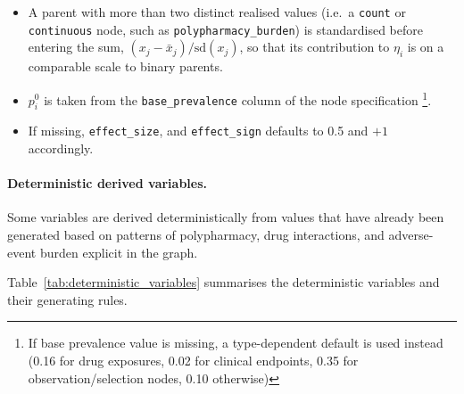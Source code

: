 \begin{itemize}
    \item A parent with more than two distinct realised values (i.e.\ a
    \texttt{count} or \texttt{continuous} node, such as
    \texttt{polypharmacy\_burden}) is standardised before entering
    the sum, $(x_j - \bar{x}_j) / \mathrm{sd}(x_j)$, so that its
    contribution to $\eta_i$ is on a comparable scale to binary parents.
    \item $p_i^{0}$ is taken from the \texttt{base\_prevalence} column of
    the node specification \footnote{If base prevalence value is missing, a type-dependent
    default is used instead (0.16 for drug exposures, 0.02 for clinical
    endpoints, 0.35 for observation/selection nodes, 0.10 otherwise)}.
    \item  If missing, \texttt{effect\_size}, and
    \texttt{effect\_sign} defaults to 0.5 and $+1$ accordingly.
\end{itemize}

\paragraph{Deterministic derived variables.}

Some variables are derived deterministically from values that have already been
generated based on  patterns of polypharmacy, drug interactions, and
adverse-event burden explicit in the graph.

Table~\ref{tab:deterministic_variables} summarises the deterministic
variables and their generating rules. 

